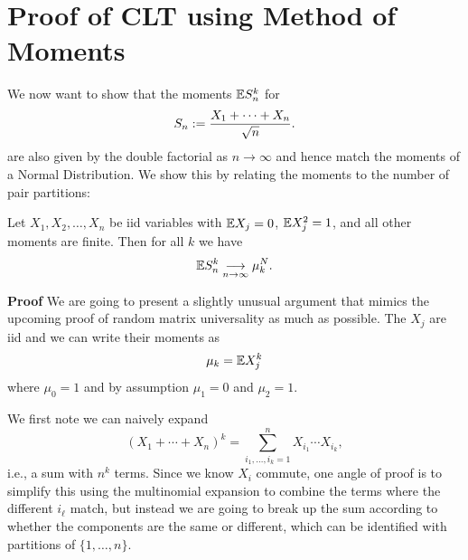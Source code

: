 \section{Proof of CLT using Method of Moments}
We now want to show that the moments ${\mathbb E} S_n^k$ for
\[
S_n := {X_1 + \ensuremath{\cdots} + X_n \over \sqrt{n}}.
\]
are also given by the double factorial as $n \ensuremath{\rightarrow} \ensuremath{\infty}$ and hence match the moments of a Normal Distribution.  We show this by relating the moments to the number of pair partitions:

\begin{theorem}[CLT] Let $X_1, X_2, \ensuremath{\ldots}, X_n$ be iid variables with ${\mathbb E} X_j = 0$, ${\mathbb E} X_j^2 = 1$, and all other moments are finite. Then for all $k$ we have
\[
{\mathbb E} S_n^k \underset{n \rightarrow \infty}{\longrightarrow} \mu_k^N.
\]
\end{theorem}
\textbf{Proof} We are going to present a slightly unusual argument that mimics the upcoming proof of random matrix universality as much as possible. The $X_j$  are iid and we can write their moments as
\[
\mu_k = {\mathbb E} X_j^k
\]
where $\ensuremath{\mu}_0 = 1$ and by assumption $\ensuremath{\mu}_1 = 0$ and $\ensuremath{\mu}_2 = 1$.

We first note we can naively expand
\[
(X_1 + \ensuremath{\cdots} + X_n)^k = \ensuremath{\sum}_{i_1,\ensuremath{\ldots},i_k=1}^n X_{i_1} \ensuremath{\cdots} X_{i_k},
\]
i.e., a sum with $n^k$ terms. Since we know $X_i$ commute, one angle of proof is to simplify this using the multinomial expansion to combine the terms where the different $i_\ensuremath{\ell}$ match, but instead we are going to break up the sum according to whether the components are the same or different, which can be identified with partitions of $\{1,\ensuremath{\ldots},n\}$.

